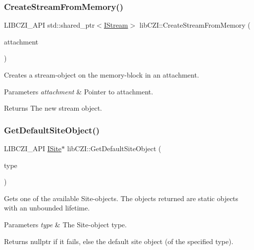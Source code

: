 \subsubsection{\texorpdfstring{Create\+Stream\+From\+Memory()}{CreateStreamFromMemory()}\hspace{0.1cm}{\footnotesize\ttfamily [2/2]}}
{\footnotesize\ttfamily L\+I\+B\+C\+Z\+I\+\_\+\+A\+PI std\+::shared\+\_\+ptr$<$\hyperlink{classlib_c_z_i_1_1_i_stream}{I\+Stream}$>$ lib\+C\+Z\+I\+::\+Create\+Stream\+From\+Memory (\begin{DoxyParamCaption}\item[{\hyperlink{classlib_c_z_i_1_1_i_attachment}{I\+Attachment} $\ast$}]{attachment }\end{DoxyParamCaption})}

Creates a stream-\/object on the memory-\/block in an attachment. 
\begin{DoxyParams}{Parameters}
{\em attachment} & Pointer to attachment. \\
\hline
\end{DoxyParams}
\begin{DoxyReturn}{Returns}
The new stream object. 
\end{DoxyReturn}
\mbox{\label{namespacelib_c_z_i_a12210a6ee4bbda8306b25648f2c4833d}} 
\subsubsection{\texorpdfstring{Get\+Default\+Site\+Object()}{GetDefaultSiteObject()}}
{\footnotesize\ttfamily L\+I\+B\+C\+Z\+I\+\_\+\+A\+PI \hyperlink{classlib_c_z_i_1_1_i_site}{I\+Site}$\ast$ lib\+C\+Z\+I\+::\+Get\+Default\+Site\+Object (\begin{DoxyParamCaption}\item[{\hyperlink{namespacelib_c_z_i_a77743727a5f0709a64237e58b9254983}{lib\+C\+Z\+I\+::\+Site\+Object\+Type}}]{type }\end{DoxyParamCaption})}

Gets one of the available Site-\/objects. The objects returned are static objects with an unbounded lifetime. 
\begin{DoxyParams}{Parameters}
{\em type} & The Site-\/object type. \\
\hline
\end{DoxyParams}
\begin{DoxyReturn}{Returns}
nullptr if it fails, else the default site object (of the specified type). 
\end{DoxyReturn}
\mbox{\label{namespacelib_c_z_i_aa8ab65987d0101d1e6a7f7a8c5f0941e}} 
